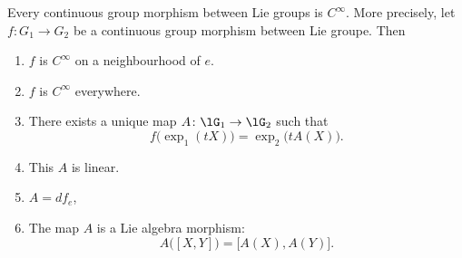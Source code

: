 \begin{proposition}	\label{PROPooYHTQooDSsftm}
	Every continuous group morphism between Lie groups is \( C^{\infty}\). More precisely, let \(f \colon G_1\to G_2  \) be a continuous group morphism between Lie groupe. Then
	\begin{enumerate}
		\item		\label{ITEMooUASHooGyammh}
		      \( f\) is \( C^{\infty}\) on a neighbourhood of \( e\).
		\item		\label{ITEMooHUZOooWjoVyt}
		      \( f\) is \( C^{\infty}\) everywhere.
		\item
		      There exists a unique map \(A \colon \lG_1\to \lG_2  \) such that
		      \begin{equation}
			      f\big( \exp_1(tX) \big)=\exp_2\big( tA(X) \big).
		      \end{equation}
		\item
		      This \( A\) is linear.
		\item		\label{ITEMooGEZTooZyDSlo}
		      \( A=df_e\),
		\item		\label{ITEMooNPSMooEHkuJw}
		      The map \( A\) is a Lie algebra morphism:
		      \begin{equation}
			      A\big( [X,Y] \big)=\big[   A(X),A(Y) \big].
		      \end{equation}
	\end{enumerate}
\end{proposition}

